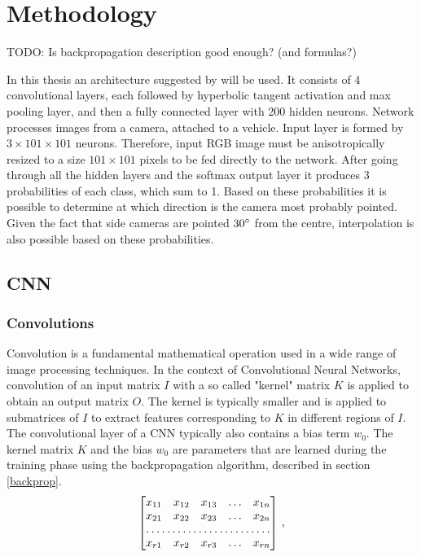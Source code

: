 \chapter{Methodology}

TODO: Is backpropagation description good enough? (and formulas?)

In this thesis an architecture suggested by \citeauthor{giusti2016machine} will be used. It consists of 4 convolutional layers, each followed by hyperbolic tangent activation and max pooling layer, and then a fully connected layer with 200 hidden neurons. Network processes images from a camera, attached to a vehicle. Input layer is formed by $3\times 101\times101$ neurons. Therefore, input \acs{RGB} image must be anisotropically resized to a size $101\times101$ pixels to be fed directly to the network. After going through all the hidden layers and the softmax output layer it produces 3 probabilities of each class, which sum to 1. Based on these probabilities it is possible to determine at which direction is the camera most probably pointed. Given the fact that side cameras are pointed $30 \degree$ from the centre, interpolation is also possible based on these probabilities.  


\section{\acs{CNN}}
\subsection{Convolutions}

Convolution is a fundamental mathematical operation used in a wide range of image processing techniques. In the context of Convolutional Neural Networks, convolution of an input matrix $I$ with a so called "kernel" matrix $K$ is applied to obtain an output matrix $O$. The kernel is typically smaller and is applied to submatrices of $I$ to extract features corresponding to $K$ in different regions of $I$. The convolutional layer of a \acs{CNN} typically also contains a bias term $w_0$. The kernel matrix $K$ and the bias $w_0$ are parameters that are learned during the training phase using the backpropagation algorithm, described in section \ref{backprop}. 
\begin{equation}
	\begin{bmatrix}
    x_{11}       & x_{12} & x_{13} & \dots & x_{1n} \\
    x_{21}       & x_{22} & x_{23} & \dots & x_{2n} \\
    \hdotsfor{5} \\
    x_{r1}       & x_{r2} & x_{r3} & \dots & x_{rn}
\end{bmatrix}\,,
\label{Input data}
\end{equation}

